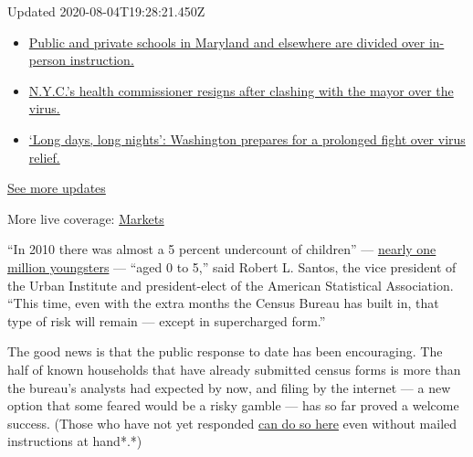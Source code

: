 Updated 2020-08-04T19:28:21.450Z

\begin{itemize}
\tightlist
\item
  \href{https://www.nytimes3xbfgragh.onion/2020/08/04/world/coronavirus-cases.html?action=click\&pgtype=Article\&state=default\&region=MAIN_CONTENT_1\&context=storylines_live_updates\#link-4825b93}{Public
  and private schools in Maryland and elsewhere are divided over
  in-person instruction.}
\item
  \href{https://www.nytimes3xbfgragh.onion/2020/08/04/world/coronavirus-cases.html?action=click\&pgtype=Article\&state=default\&region=MAIN_CONTENT_1\&context=storylines_live_updates\#link-4d1eafa8}{N.Y.C.'s
  health commissioner resigns after clashing with the mayor over the
  virus.}
\item
  \href{https://www.nytimes3xbfgragh.onion/2020/08/04/world/coronavirus-cases.html?action=click\&pgtype=Article\&state=default\&region=MAIN_CONTENT_1\&context=storylines_live_updates\#link-6b644638}{`Long
  days, long nights': Washington prepares for a prolonged fight over
  virus relief.}
\end{itemize}

\href{https://www.nytimes3xbfgragh.onion/2020/08/04/world/coronavirus-cases.html?action=click\&pgtype=Article\&state=default\&region=MAIN_CONTENT_1\&context=storylines_live_updates}{See
more updates}

More live coverage:
\href{https://www.nytimes3xbfgragh.onion/live/2020/08/04/business/stock-market-today-coronavirus?action=click\&pgtype=Article\&state=default\&region=MAIN_CONTENT_1\&context=storylines_live_updates}{Markets}

``In 2010 there was almost a 5 percent undercount of children'' ---
\href{https://www.census.gov/content/dam/Census/library/working-papers/2014/demo/2014-undercount-children.pdf}{nearly
one million youngsters} --- ``aged 0 to 5,'' said Robert L. Santos, the
vice president of the Urban Institute and president-elect of the
American Statistical Association. ``This time, even with the extra
months the Census Bureau has built in, that type of risk will remain ---
except in supercharged form.''

The good news is that the public response to date has been encouraging.
The half of known households that have already submitted census forms is
more than the bureau's analysts had expected by now, and filing by the
internet --- a new option that some feared would be a risky gamble ---
has so far proved a welcome success. (Those who have not yet responded
\href{https://2020census.gov}{can do so here} even without mailed
instructions at hand*.*)

